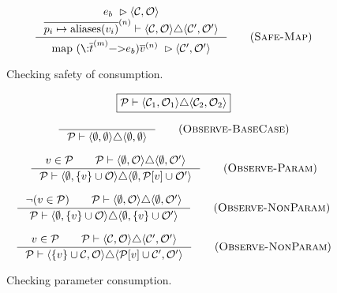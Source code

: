 \begin{figure}
\begin{equation*}
\inference{
  \inPlaceSafe{e_{b}}{\mathcal{C}}{\mathcal{O}}
  \\
  \consumedOK
  {\nseq{p_{i} \mapsto \aliases{v_{i}}}{n}}
  {\langle\mathcal{C},\mathcal{O}\rangle}
  {\langle\mathcal{C}',\mathcal{O}'\rangle}
}{
  \inPlaceSafe
  {\text{\lstinline[mathescape]!map ($\Fn\nseq{p}{n}$: $\nseq{t}{m}$ -> $e_{b}$) $\nseq{v}{n}$!}}
  {\mathcal{C}'}{\mathcal{O}'}
}
\tagsc{Safe-Map}
\end{equation*}

  \caption{Checking safety of consumption.}
  \label{fig:uniqueness-rules}
\end{figure}

\begin{figure}
\begin{equation*}
\boxed{
  \mathcal{P} \vdash \langle\mathcal{C}_{1},\mathcal{O}_{1}\rangle \triangle \langle\mathcal{C}_{2},\mathcal{O}_{2}\rangle
}
\end{equation*}

\begin{equation*}
\inference{
}{
\mathcal{P} \vdash \langle \emptyset, \emptyset \rangle \triangle \langle \emptyset, \emptyset \rangle
} \tagsc{Observe-BaseCase}
\end{equation*}

\begin{equation*}
\inference{
v \in \mathcal{P} \qquad \mathcal{P} \vdash \langle \emptyset, \mathcal{O} \rangle \triangle \langle \emptyset, \mathcal{O}' \rangle
}
{
\mathcal{P} \vdash \langle \emptyset, \{ v \} \cup \mathcal{O} \rangle \triangle \langle \emptyset, \mathcal{P}[v] \cup \mathcal{O}' \rangle
}\tagsc{Observe-Param}
\end{equation*}

\begin{equation*}
\inference{
\neg(v \in \mathcal{P}) \qquad \mathcal{P} \vdash \langle \emptyset, \mathcal{O} \rangle \triangle \langle \emptyset, \mathcal{O}' \rangle
}
{
\mathcal{P} \vdash \langle \emptyset, \{ v \} \cup \mathcal{O} \rangle \triangle \langle \emptyset, \{ v \} \cup \mathcal{O}' \rangle
}\tagsc{Observe-NonParam}
\end{equation*}

\begin{equation*}
\inference{
v \in \mathcal{P} \qquad \mathcal{P} \vdash \langle \mathcal{C}, \mathcal{O} \rangle \triangle \langle \mathcal{C}', \mathcal{O}' \rangle
}
{
\mathcal{P} \vdash \langle \{ v \} \cup \mathcal{C}, \mathcal{O} \rangle \triangle \langle \mathcal{P}[v] \cup \mathcal{C}', \mathcal{O}' \rangle
}\tagsc{Observe-NonParam}
\end{equation*}
  \caption{Checking parameter consumption.}
  \label{fig:parameter-consumption}
\end{figure}


